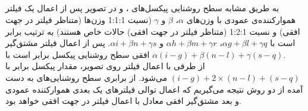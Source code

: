 \documentclass{article}
\begin{document}
\subsection{}
به طریق مشابه سطح روشنایی پیکسل‌های ،  و  در تصویر پس از اعمال یک فیلتر هموارکننده‌ی عمودی با وزن‌های $\alpha$، $\beta$ و $\gamma$ (نسبت 1:1:1 وزن‌ها (متناظر فیلتر  در جهت افقی) و نسبت 1:2:1 (متناظر فیلتر  در جهت افقی) حالات خاص هستند) به ترتیب برابر است با
$
\alpha g + \beta l + \gamma q
$،
$
\alpha h + \beta m + \gamma r
$
و
$
\alpha i + \beta n + \gamma s
$.
پس از اعمال فیلتر مشتق‌گیر افقی سطح روشنایی پیکسل  برابر است با 
$
\alpha (i - g) + \beta (n - l) + \gamma (s - q)
$. \\
از طرفی با اعمال فیلتر  روی تصویر، مقدار پیکسل  برابر با 
$
(i - g) + 2 \times (n - l) + (s - q)
$
می‌شود. از برابری سطح روشنایی‌های به دست آمده از دو روش نتیجه می‌گیریم که اعمال توالی فیلترهای یک بعدی هموارکننده عمودی و بعد مشتق‌گیر افقی معادل با اعمال فیلتر  در جهت افقی خواهد بود.


\section{}%





\section{}%
\end{document}
